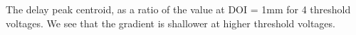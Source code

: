 \label{fig:thresholdtest} The delay peak centroid, as a ratio of the value at DOI = 1mm for 4 threshold voltages. We see that the gradient is shallower at higher threshold voltages.